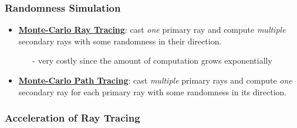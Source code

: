 \documentclass[twocolumn,landscape,10pt]{article}
\theoremstyle{definition}
\begin{document}
\subsubsection{Randomness Simulation}

\begin{itemize}
    \item \underline{\textbf{Monte-Carlo Ray Tracing}}: cast \emph{one} primary
        ray and compute \emph{multiple} secondary rays with some randomness in
        their direction.
        \begin{itemize}
            \item[-] very costly since the amount of computation grows
                exponentially
        \end{itemize} 
    \item \underline{\textbf{Monte-Carlo Path Tracing}}: cast \emph{multiple}
        primary rays and compute \emph{one} secondary ray for each primary ray
        with some randomness in its direction.
\end{itemize} 

\subsubsection{Acceleration of Ray Tracing}
\end{document}
